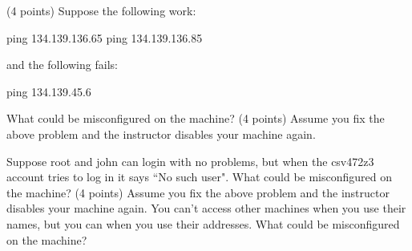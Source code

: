 \ques
(4 points)
Suppose the following work:

{\program
 ping 134.139.136.65
 ping 134.139.136.85
\endprogram}

and the following fails:

{\program
 ping 134.139.45.6
\endprogram}

What could be misconfigured on the machine?
\vfill
\ques
(4 points)
Assume you fix the above problem and the instructor disables your machine
again.

Suppose {\ltt{}root} and {\ltt{}john} can login with no problems, but when 
the {\ltt{}csv472z3} account tries to log in it says ``No such user".
What could be misconfigured on the machine?
\vfill
\ques
(4 points)
Assume you fix the above problem and the instructor disables your machine
again.
You can't access other machines when you use their names, but
you can when you use their addresses.
What could be misconfigured on the machine?
\bye
